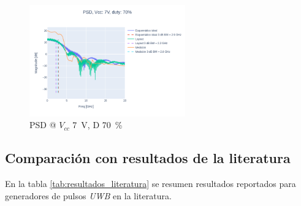 \begin{figure}
  \centering
    \includegraphics[width=0.6\textwidth]{images/plots/Vcc_7V_duty_70_psd.png}
    \caption{PSD @ $V_{cc}$ \qty{7}{\volt}, D \qty{70}{\percent} }
    \label{fig:psd_7v_70}
\end{figure}

\subsection{Comparación con resultados de la literatura}

En la tabla \ref{tab:resultados_literatura} se resumen resultados reportados
para generadores de pulsos \textit{UWB} en la literatura.

